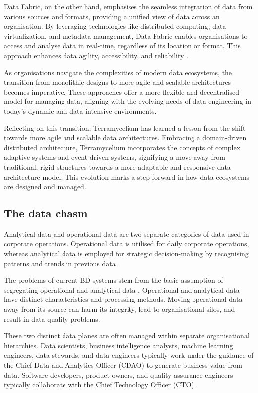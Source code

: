 \documentclass[preprint,12pt]{elsarticle}
\begin{document}
Data Fabric, on the other hand, emphasises the seamless integration of data from various sources and formats, providing a unified view of data across an organisation. By leveraging technologies like distributed computing, data virtualization, and metadata management, Data Fabric enables organisations to access and analyse data in real-time, regardless of its location or format. This approach enhances data agility, accessibility, and reliability \cite{Bode2023}.

As organisations navigate the complexities of modern data ecosystems, the transition from monolithic designs to more agile and scalable architectures becomes imperative. These approaches offer a more flexible and decentralised model for managing data, aligning with the evolving needs of data engineering in today's dynamic and data-intensive environments.

Reflecting on this transition, Terramycelium has learned a lesson from the shift towards more agile and scalable data architectures. Embracing a domain-driven distributed architecture, Terramycelium incorporates the concepts of complex adaptive systems and event-driven systems, signifying a move away from traditional, rigid structures towards a more adaptable and responsive data architecture model. This evolution marks a step forward in how data ecosystems are designed and managed.

\subsection{The data chasm}

Analytical data and operational data are two separate categories of data used in corporate operations. Operational data is utilised for daily corporate operations, whereas analytical data is employed for strategic decision-making by recognising patterns and trends in previous data \cite{kimball2013data}.

The problems of current BD systems stem from the basic assumption of segregating operational and analytical data \cite{ataei2022state}. Operational and analytical data have distinct characteristics and processing methods. Moving operational data away from its source can harm its integrity, lead to organisational silos, and result in data quality problems. 

These two distinct data planes are often managed within separate organisational hierarchies. Data scientists, business intelligence analysts, machine learning engineers, data stewards, and data engineers typically work under the guidance of the Chief Data and Analytics Officer (CDAO) to generate business value from data. Software developers, product owners, and quality assurance engineers typically collaborate with the Chief Technology Officer (CTO) \cite{DataMesh}.
\end{document}
